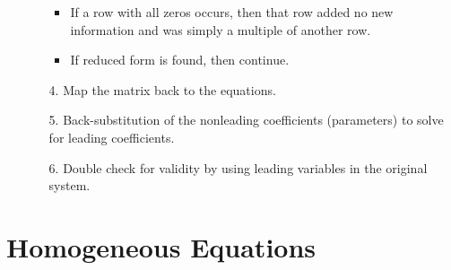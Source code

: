 \begin{itemize}
\begin{itemize}
\begin{itemize}
      \item If a row with all zeros occurs, then that row added no new information and was simply a multiple of another row.
      \item If reduced form is found, then continue.
    \end{itemize} 
    \item[4.] Map the matrix back to the equations.
    \item[5.] Back-substitution of the nonleading coefficients (parameters) to solve for leading coefficients.
    \item[6.] Double check for validity by using leading variables in the original system. 
  \end{itemize}
\end{itemize}


\section{Homogeneous Equations}\label{Homogeneous Equations}
